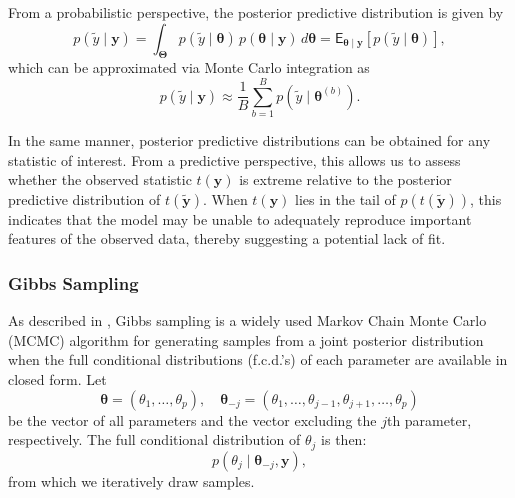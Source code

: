 \vspace{0.5cm}

From a probabilistic perspective, the posterior predictive distribution is given by
\begin{equation}
p(\tilde{y}\mid \bm{y})
= \int_{\bm{\Theta}} p(\tilde{y}\mid \bm{\theta}) \, p(\bm{\theta}\mid \bm{y}) 
\, d\bm{\theta}
= \mathsf{E}_{\bm{\theta}\mid \bm{y}}\!\left[p(\tilde{y}\mid \bm{\theta})\right],
\end{equation}
which can be approximated via Monte Carlo integration as
\begin{equation}
p(\tilde{y}\mid \bm{y})
\approx \frac{1}{B} \sum_{b=1}^{B} p(\tilde{y} \mid \bm{\theta}^{(b)}).
\end{equation}

\vspace{0.5cm}

In the same manner, posterior predictive distributions can be obtained for any 
statistic of interest. From a predictive perspective, this allows us to assess 
whether the observed statistic \( t(\bm{y}) \) is extreme relative to the 
posterior predictive distribution of \( t(\bm{\tilde{y}}) \). When 
\( t(\bm{y}) \) lies in the tail of 
\( p\!\left(t(\bm{\tilde{y}})\right) \), this indicates that the model may be 
unable to adequately reproduce important features of the observed data, thereby 
suggesting a potential lack of fit.




\subsubsection{Gibbs Sampling}

As described in \cite{HOFF}, Gibbs sampling is a widely used Markov Chain Monte Carlo (MCMC) algorithm for generating samples from a joint posterior distribution when the full conditional distributions (f.c.d.'s) of each parameter are available in closed form. Let 
$$
\bm{\theta} = \left( \theta_1, \ldots, \theta_p \right), \quad \bm{\theta}_{-j} = \left( \theta_1, \ldots, \theta_{j-1}, \theta_{j+1}, \ldots, \theta_p \right)
$$
be the vector of all parameters and the vector excluding the $j$th parameter, respectively. The full conditional distribution of $\theta_j$ is then:
\begin{equation} 
\label{fcd}
p\left(\theta_{j} \mid \bm{\theta}_{-j}, \bm{y}\right),
\end{equation}
from which we iteratively draw samples.

